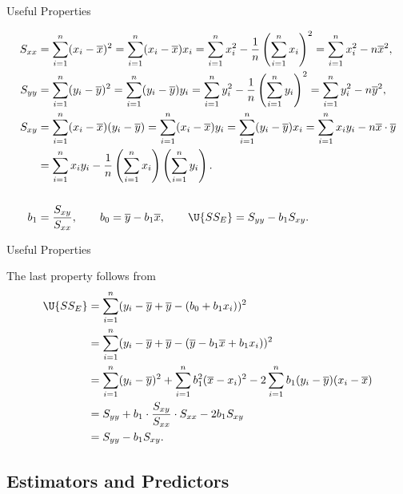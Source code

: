 \begin{frame}{Useful Properties}

\justifying
{}
\footnotesize
\begin{align*}
S_{xx} & = \sum_{i=1}^n (x_i - \overline{x})^2 = \sum_{i=1}^n (x_i - \overline{x})x_i = \sum_{i=1}^n x_i^2 - \frac{1}{n}\left(\sum_{i=1}^n x_i\right)^2  = \sum_{i=1}^n x_i^2 - n\overline{x}^2, \\
S_{yy} & = \sum_{i=1}^n (y_i - \overline{y})^2 = \sum_{i=1}^n (y_i - \overline{y})y_i = \sum_{i=1}^n y_i^2 - \frac{1}{n}\left(\sum_{i=1}^n y_i\right)^2 = \sum_{i=1}^n y_i^2 - n\overline{y}^2, \\
S_{xy} & = \sum_{i=1}^n (x_i - \overline{x})(y_i - \overline{y}) = \sum_{i=1}^n (x_i - \overline{x})y_i = \sum_{i=1}^n (y_i - \overline{y})x_i = \sum_{i=1}^n x_iy_i - n\overline{x}\cdot\overline{y} \\
& = \sum_{i=1}^n x_iy_i - \frac{1}{n}\left(\sum_{i=1}^n x_i \right)\left(\sum_{i=1}^n y_i \right). \\\\
b_1 & = \frac{S_{xy}}{S_{xx}}, \qquad b_0 = \overline{y} - b_1\overline{x},\qquad \U{SS_E} = S_{yy} - b_1 S_{xy}.
\end{align*}

\end{frame}


\begin{frame}{Useful Properties}

\justifying
{} The last property follows from
\begin{align*}
\U{SS_E} & = \sum_{i=1}^n (y_i - \overline{y} + \overline{y} - (b_0 + b_1x_i))^2 \\
& = \sum_{i=1}^n (y_i - \overline{y} + \overline{y} - (\overline{y} - b_1\overline{x} + b_1x_i))^2 \\
& = \sum_{i=1}^n (y_i - \overline{y})^2 + \sum_{i=1}^n b_1^2(\overline{x} - x_i)^2 - 2\sum_{i=1}^n b_1(y_i-\overline{y})(x_i-\overline{x}) \\
& = S_{yy} + b_1 \cdot \frac{S_{xy}}{S_{xx}}\cdot S_{xx} - 2b_1S_{xy} \\
& = S_{yy} - b_1 S_{xy}.
\end{align*}

\end{frame}


\subsection{Estimators and Predictors}


